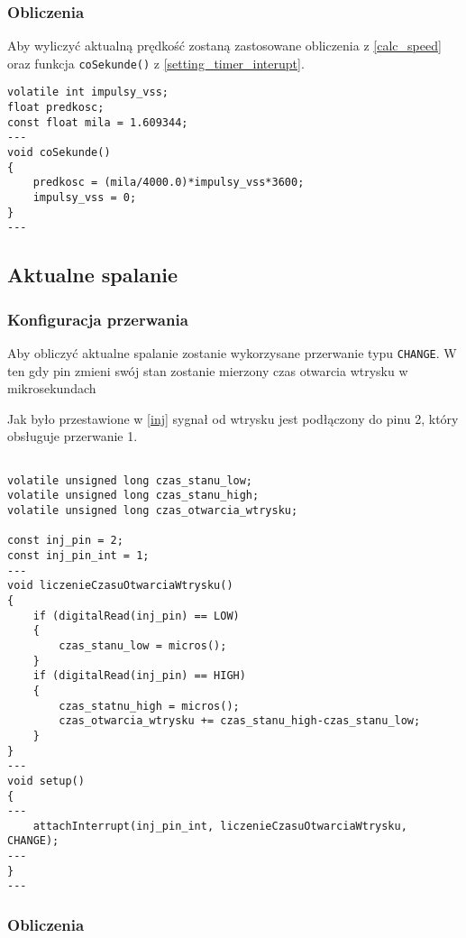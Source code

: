 \subsubsection{Obliczenia} \label{code_speed}

Aby wyliczyć aktualną prędkość zostaną zastosowane obliczenia z \ref{calc_speed} oraz funkcja \texttt{coSekunde()} z \ref{setting_timer_interupt}.

\begin{lstlisting}[label=list:vss_int,caption=Wyliczanie aktualnej prędkości,
basicstyle=\footnotesize\ttfamily]
volatile int impulsy_vss;
float predkosc;
const float mila = 1.609344;
---
void coSekunde()
{
    predkosc = (mila/4000.0)*impulsy_vss*3600;
    impulsy_vss = 0;
}
---
\end{lstlisting}

\subsection{Aktualne spalanie}
\subsubsection{Konfiguracja przerwania}

Aby obliczyć aktualne spalanie zostanie wykorzysane przerwanie typu \texttt{CHANGE}. W ten gdy pin zmieni swój stan zostanie mierzony czas otwarcia wtrysku w mikrosekundach

Jak było przestawione w \ref{inj} sygnał od wtrysku jest podłączony do pinu 2, który obsługuje przerwanie 1.

\begin{lstlisting}[label=list:inj_int,caption=Ustawianie przerwania wtrysku,
basicstyle=\footnotesize\ttfamily]

volatile unsigned long czas_stanu_low;
volatile unsigned long czas_stanu_high;
volatile unsigned long czas_otwarcia_wtrysku;

const inj_pin = 2;
const inj_pin_int = 1;
---
void liczenieCzasuOtwarciaWtrysku()
{
    if (digitalRead(inj_pin) == LOW)
    {
        czas_stanu_low = micros();
    }
    if (digitalRead(inj_pin) == HIGH)
    {
        czas_statnu_high = micros();
        czas_otwarcia_wtrysku += czas_stanu_high-czas_stanu_low;
    }
}
---
void setup()
{
---
    attachInterrupt(inj_pin_int, liczenieCzasuOtwarciaWtrysku, CHANGE);
---
}
---
\end{lstlisting}

\subsubsection{Obliczenia}

